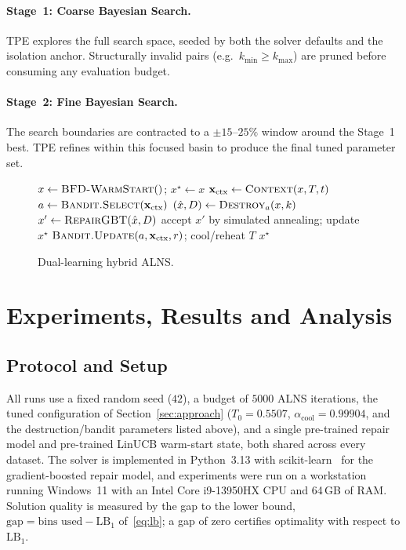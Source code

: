 \documentclass[conference]{IEEEtran}
\begin{document}
\paragraph{Stage~1: Coarse Bayesian Search.}
TPE explores the full search space, seeded by both the solver defaults and the
isolation anchor. Structurally invalid pairs (e.g.\ $k_{\min} \ge k_{\max}$) are
pruned before consuming any evaluation budget.

\paragraph{Stage~2: Fine Bayesian Search.}
The search boundaries are contracted to a $\pm15$--$25\%$ window around the Stage~1
best. TPE refines within this focused basin to produce the final tuned parameter set.


\begin{figure}[t]
	\centering
	\begin{algorithmic}[1]
		\STATE $x \leftarrow \textsc{BFD-WarmStart}()$;\; $x^\star \leftarrow x$
		\STATE $\mathbf{x}_{\text{ctx}} \leftarrow \textsc{Context}(x,T,t)$
		\STATE $a \leftarrow \textsc{Bandit.Select}(\mathbf{x}_{\text{ctx}})$
		\STATE $(\hat{x},D) \leftarrow \textsc{Destroy}_a(x,k)$
		\STATE $x' \leftarrow \textsc{RepairGBT}(\hat{x},D)$
		\STATE accept $x'$ by simulated annealing; update $x^\star$
		\STATE $\textsc{Bandit.Update}(a,\mathbf{x}_{\text{ctx}},r)$;\; cool/reheat $T$
		\ENDFOR
		\RETURN $x^\star$
	\end{algorithmic}
	\caption{Dual-learning hybrid ALNS.}
	\label{alg:alns}
\end{figure}

\section{Experiments, Results and Analysis}\label{sec:experiments}

\subsection{Protocol and Setup}
All runs use a fixed random seed ($42$), a budget of $5000$ ALNS iterations,
the tuned configuration of Section~\ref{sec:approach} ($T_0=0.5507$,
$\alpha_{\mathrm{cool}}=0.99904$, and the destruction/bandit parameters listed
above), and a single pre-trained repair model and pre-trained LinUCB warm-start
state, both shared across every dataset. The solver is
implemented in Python~3.13 with scikit-learn~\cite{bPedregosa} for the
gradient-boosted repair model, and experiments were run on a workstation running
Windows~11 with an Intel Core i9-13950HX CPU and 64\,GB of RAM. Solution quality
is measured by the gap to the
lower bound, $\text{gap}=\text{bins used}-\mathrm{LB}_1$ of~\eqref{eq:lb}; a gap of
zero certifies optimality with respect to $\mathrm{LB}_1$.
\end{document}
